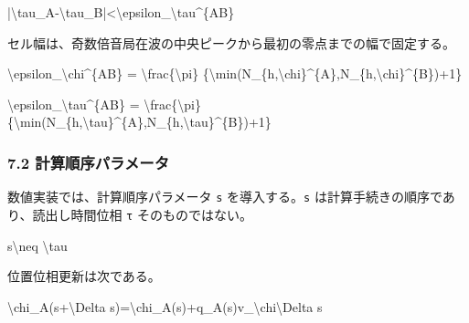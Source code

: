 \documentclass[
  a4paper,
]{article}
\newenvironment{Shaded}{}{}
\newcommand{\NormalTok}[1]{#1}
\begin{document}
\begin{Shaded}
\begin{Highlighting}[]
\NormalTok{|\textbackslash{}tau\_A{-}\textbackslash{}tau\_B|\textless{}\textbackslash{}epsilon\_\textbackslash{}tau\^{}\{AB\}}
\end{Highlighting}
\end{Shaded}

セル幅は、奇数倍音局在波の中央ピークから最初の零点までの幅で固定する。

\begin{Shaded}
\begin{Highlighting}[]
\NormalTok{\textbackslash{}epsilon\_\textbackslash{}chi\^{}\{AB\}}
\NormalTok{=}
\NormalTok{\textbackslash{}frac\{\textbackslash{}pi\}}
\NormalTok{\{\textbackslash{}min(N\_\{h,\textbackslash{}chi\}\^{}\{A\},N\_\{h,\textbackslash{}chi\}\^{}\{B\})+1\}}
\end{Highlighting}
\end{Shaded}

\begin{Shaded}
\begin{Highlighting}[]
\NormalTok{\textbackslash{}epsilon\_\textbackslash{}tau\^{}\{AB\}}
\NormalTok{=}
\NormalTok{\textbackslash{}frac\{\textbackslash{}pi\}}
\NormalTok{\{\textbackslash{}min(N\_\{h,\textbackslash{}tau\}\^{}\{A\},N\_\{h,\textbackslash{}tau\}\^{}\{B\})+1\}}
\end{Highlighting}
\end{Shaded}

\subsubsection{7.2
計算順序パラメータ}\label{ux8a08ux7b97ux9806ux5e8fux30d1ux30e9ux30e1ux30fcux30bf}

数値実装では、計算順序パラメータ \texttt{s} を導入する。\texttt{s}
は計算手続きの順序であり、読出し時間位相 \texttt{τ} そのものではない。

\begin{Shaded}
\begin{Highlighting}[]
\NormalTok{s\textbackslash{}neq \textbackslash{}tau}
\end{Highlighting}
\end{Shaded}

位置位相更新は次である。

\begin{Shaded}
\begin{Highlighting}[]
\NormalTok{\textbackslash{}chi\_A(s+\textbackslash{}Delta s)=\textbackslash{}chi\_A(s)+q\_A(s)v\_\textbackslash{}chi\textbackslash{}Delta s}
\end{Highlighting}
\end{Shaded}
\end{document}
